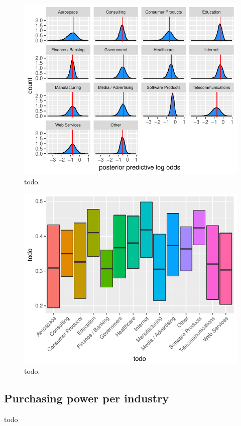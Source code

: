 \documentclass{article}
\begin{document}
\begin{figure}[H]
\centering
\includegraphics{report-036}
\caption{todo.}\label{fig_10}
\end{figure}


\begin{figure}[H]
\centering
\includegraphics{report-038}
\caption{todo.}\label{fig_11}
\end{figure}

\subsection{Purchasing power per industry}
todo
\end{document}
